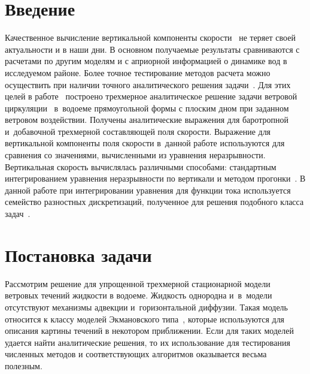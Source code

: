 \documentclass[press]{vestnik}
\begin{document}

\date{27-05-2024}

\maketitle

\section*{Введение}

Качественное вычисление вертикальной компоненты скорости~\cite{B01} не теряет 
своей актуальности и в наши дни. В основном получаемые результаты 
сравниваются с расчетами по другим моделям и с априорной информацией о 
динамике вод в исследуемом районе. Более точное тестирование методов расчета 
можно осуществить при наличии точного аналитического решения задачи~\cite{B02}. Для 
этих целей в работе~\cite{B03} построено трехмерное аналитическое решение задачи 
ветровой циркуляции~\cite{B04,B05} в~водоеме прямоугольной формы с плоским дном при 
заданном ветровом воздействии. Получены аналитические выражения для 
баротропной и~добавочной трехмерной составляющей поля скорости. Выражение 
для вертикальной компоненты поля скорости в~данной работе используются для 
сравнения со значениями, вычисленными из уравнения неразрывности. 
Вертикальная скорость вычислялась различными способами: стандартным 
интегрированием уравнения неразрывности по вертикали и методом прогонки~\cite{B06}. 
В данной работе при интегрировании уравнения для функции тока используется 
семейство разностных дискретизаций, полученное для решения подобного класса 
задач~\cite{B07}. 

\section{Постановка задачи}

Рассмотрим решение для упрощенной трехмерной 
стационарной модели ветровых течений жидкости в водоеме. Жидкость однородна 
и~в~модели отсутствуют механизмы адвекции и~горизонтальной диффузии. Такая 
модель относится к классу моделей Экмановского типа~\cite{B08}, которые 
используются для описания картины течений в некотором приближении. Если для 
таких моделей удается найти аналитические решения, то их использование для 
тестирования численных методов и соответствующих алгоритмов оказывается 
весьма полезным.
\end{document}
